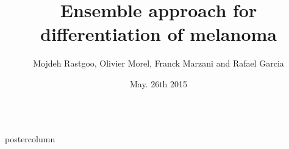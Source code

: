 \documentclass[final]{beamer}
\title{\huge Ensemble approach for differentiation of melanoma}
\author{Mojdeh Rastgoo, Olivier Morel, Franck Marzani and Rafael Garcia}
\institute[Univerist\'e de Bourgogne, Universitat de Girona]{Univerist\'e de Bourgogne - Le2i, Universitat de Girona - Vicorob}
\date[May. 26th 2015]{May. 26th 2015}
\newlength{\columnheight}
\begin{document}
\begin{frame}
  \begin{columns}
    
    \begin{column}{.49\textwidth}
      \begin{beamercolorbox}[center,wd=\textwidth]{postercolumn}
        \begin{minipage}[T]{.95\textwidth}  %
          \parbox[t][\columnheight]{\textwidth}{ %

}
\end{minipage}
\end{beamercolorbox}
\end{column}
\end{columns}
\end{frame}
\end{document}

